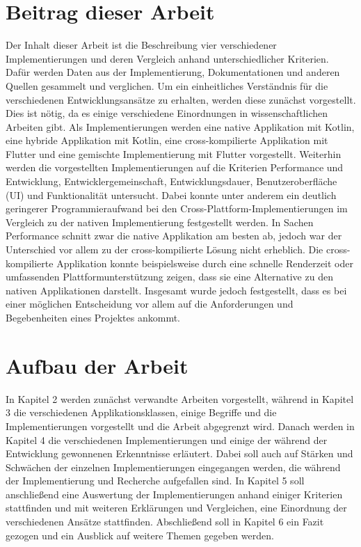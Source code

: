 \section{Beitrag dieser Arbeit}
Der Inhalt dieser Arbeit ist die Beschreibung vier verschiedener Implementierungen und deren Vergleich anhand unterschiedlicher Kriterien. Dafür werden Daten aus der Implementierung, Dokumentationen und anderen Quellen gesammelt und verglichen.
Um ein einheitliches Verständnis für die verschiedenen Entwicklungsansätze zu erhalten, werden diese zunächst vorgestellt. Dies ist nötig, da es einige verschiedene Einordnungen in wissenschaftlichen Arbeiten gibt.
Als Implementierungen werden eine native Applikation mit Kotlin, eine hybride Applikation mit Kotlin, eine cross-kompilierte Applikation mit Flutter und eine gemischte Implementierung mit Flutter vorgestellt. 
Weiterhin werden die vorgestellten Implementierungen auf die Kriterien Performance und Entwicklung, Entwicklergemeinschaft, Entwicklungsdauer, Benutzeroberfläche (UI) und Funktionalität untersucht.
Dabei konnte unter anderem ein deutlich geringerer Programmieraufwand bei den Cross-Plattform-Implementierungen im Vergleich zu der nativen Implementierung festgestellt werden. In Sachen Performance schnitt zwar die native Applikation am besten ab, jedoch war der Unterschied vor allem zu der cross-kompilierte Lösung nicht erheblich. Die cross-kompilierte Applikation konnte beispielsweise durch eine schnelle Renderzeit oder umfassenden Plattformunterstützung zeigen, dass sie eine Alternative zu den nativen Applikationen darstellt. Insgesamt wurde jedoch festgestellt, dass es bei einer möglichen Entscheidung vor allem auf die Anforderungen und Begebenheiten eines Projektes ankommt.

\section{Aufbau der Arbeit}
In Kapitel 2 werden zunächst verwandte Arbeiten vorgestellt, während in Kapitel 3 die verschiedenen Applikationsklassen, einige Begriffe und die Implementierungen vorgestellt und die Arbeit abgegrenzt wird.
Danach werden in Kapitel 4 die verschiedenen Implementierungen und einige der während der Entwicklung gewonnenen Erkenntnisse erläutert. Dabei soll auch auf Stärken und Schwächen der einzelnen Implementierungen eingegangen werden, die während der Implementierung und Recherche aufgefallen sind.
In Kapitel 5 soll anschließend eine Auswertung der Implementierungen anhand einiger Kriterien stattfinden und mit weiteren Erklärungen und Vergleichen, eine Einordnung der verschiedenen Ansätze stattfinden. Abschließend soll in Kapitel 6 ein Fazit gezogen und ein Ausblick auf weitere Themen gegeben werden.